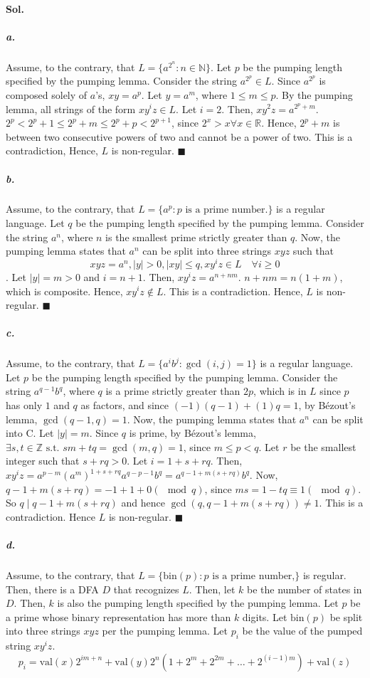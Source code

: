 \documentclass[]{article}
\begin{document}
	\paragraph{Sol.}
	\subparagraph{a.} Assume, to the contrary, that $L = \{a^{2^n} : n \in \mathbb{N}\}$. Let $p$ be the pumping length specified by the pumping lemma. Consider the string $a^{2^p} \in L$. Since $a^{2^p}$ is composed solely of $a$'s, $xy = a^p$. Let $y = a^m$, where $1 \leq m \leq p$. By the pumping lemma, all strings of the form $xy^i z \in L$. Let $i = 2$. Then, $xy^2z = a^{2^p + m}$. $2^p < 2^p + 1 \leq 2^p + m \leq 2^p + p < 2^{p+1}$, since $2^x > x \forall x \in \mathbb{R}$. Hence, $2^p + m$ is between two consecutive powers of two and cannot be a power of two. This is a contradiction, Hence, $L$ is non-regular. $\blacksquare$
	\subparagraph{b.} Assume, to the contrary, that $L = \{a^p : p \text{ is a prime number.}\}$ is a regular language. Let $q$ be the pumping length specified by the pumping lemma. Consider the string $a^n$, where $n$ is the smallest prime strictly greater than $q$. Now, the pumping lemma states that $a^n$ can be split into three strings $xyz$ such that $$xyz = a^n,|y| > 0, |xy| \leq q, xy^i z \in L \quad \forall i \geq 0$$. Let $|y| = m > 0$ and $i = n+1$. Then, $xy^iz = a^{n+nm}$. $n+nm = n(1+m)$, which is composite. Hence, $xy^iz \not\in L$. This is a contradiction. Hence, $L$ is non-regular. $\blacksquare$
	\subparagraph{c.} Assume, to the contrary, that $L = \{a^i b^j : \gcd(i,j) = 1\}$ is a regular language. Let $p$ be the pumping length specified by the pumping lemma. Consider the string $a^{q-1} b^q$, where $q$ is a prime strictly greater than $2p$, which is in $L$ since $p$ has only $1$ and $q$ as factors, and since $(-1)(q-1) + (1)q = 1$, by Bézout's lemma, $\gcd(q-1, q) = 1$.
	Now, the pumping lemma states that $a^n$ can be split into C. Let $|y| = m$. Since $q$ is prime, by Bézout's lemma, $ \exists s, t \in \mathbb{Z} \text{ s.t. } sm+tq =  \gcd(m,q) = 1$, since $m \leq p < q$. Let $r$ be the smallest integer such that $s + rq > 0$. Let $i = 1+s+rq$. Then, $xy^i z = a^{p-m} (a^m)^{1+s+rq} a^{q-p-1} b^q = a^{q-1+m(s+rq)} b^q$. Now, $q-1+m(s+rq) = -1 + 1 + 0 (\mod q)$, since $ms = 1-tq \equiv 1 (\mod q)$. So $q \mid q-1+m(s+rq)$ and hence $\gcd(q, q-1+m(s+rq)) \neq 1$. This is a contradiction. Hence $L$ is non-regular. $\blacksquare$
	\subparagraph{d.} Assume, to the contrary, that $L = \{\text{bin} (p) : p \text{ is a prime number,} \}$ is regular. Then, there is a DFA $D$ that recognizes $L$. Then, let $k$ be the number of states in $D$. Then, $k$ is also the pumping length specified by the pumping lemma. Let $p$ be a prime whose binary representation has more than $k$ digits. Let $\text{bin}(p)$ be split into three strings $xyz$ per the pumping lemma. Let $p_i$ be the value of the pumped string $xy^i z$. $$p_i = \text{val}(x) 2^{im + n} + \text{val}(y) 2^n (1+ 2^m + 2^{2m} + \dots +  2^{(i-1)m}) + \text{val}(z)$$
\end{document}
